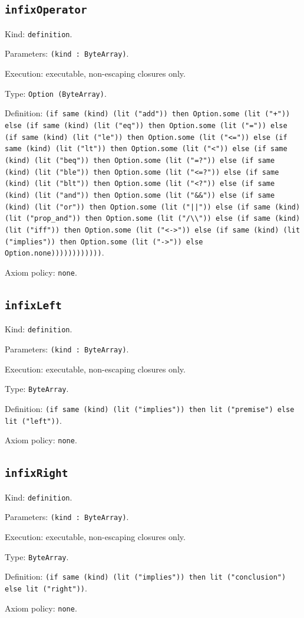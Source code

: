 \documentclass[11pt]{article}
\begin{document}
\subsection*{\texttt{infixOperator}}
\noindent Kind: \texttt{definition}.\par
\noindent Parameters: \texttt{(kind : ByteArray)}.\par
\noindent Execution: executable, non-escaping closures only.\par
\noindent Type: \texttt{Option (ByteArray)}.\par
\noindent Definition: \texttt{(if same (kind) (lit ("add")) then Option.some (lit ("+")) else (if same (kind) (lit ("eq")) then Option.some (lit ("=")) else (if same (kind) (lit ("le")) then Option.some (lit ("<=")) else (if same (kind) (lit ("lt")) then Option.some (lit ("<")) else (if same (kind) (lit ("beq")) then Option.some (lit ("=?")) else (if same (kind) (lit ("ble")) then Option.some (lit ("<=?")) else (if same (kind) (lit ("blt")) then Option.some (lit ("<?")) else (if same (kind) (lit ("and")) then Option.some (lit ("\&\&")) else (if same (kind) (lit ("or")) then Option.some (lit ("||")) else (if same (kind) (lit ("prop\_and")) then Option.some (lit ("/\textbackslash{}\textbackslash{}")) else (if same (kind) (lit ("iff")) then Option.some (lit ("<->")) else (if same (kind) (lit ("implies")) then Option.some (lit ("->")) else Option.none))))))))))))}.\par
\noindent Axiom policy: \texttt{none}.\par
\subsection*{\texttt{infixLeft}}
\noindent Kind: \texttt{definition}.\par
\noindent Parameters: \texttt{(kind : ByteArray)}.\par
\noindent Execution: executable, non-escaping closures only.\par
\noindent Type: \texttt{ByteArray}.\par
\noindent Definition: \texttt{(if same (kind) (lit ("implies")) then lit ("premise") else lit ("left"))}.\par
\noindent Axiom policy: \texttt{none}.\par
\subsection*{\texttt{infixRight}}
\noindent Kind: \texttt{definition}.\par
\noindent Parameters: \texttt{(kind : ByteArray)}.\par
\noindent Execution: executable, non-escaping closures only.\par
\noindent Type: \texttt{ByteArray}.\par
\noindent Definition: \texttt{(if same (kind) (lit ("implies")) then lit ("conclusion") else lit ("right"))}.\par
\noindent Axiom policy: \texttt{none}.\par
\end{document}
